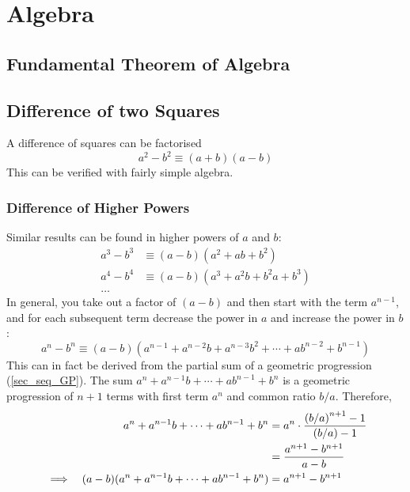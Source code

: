 \section{Algebra}

\subsection{Fundamental Theorem of Algebra}

\subsection{Difference of two Squares}

A difference of squares can be factorised
\begin{equation}
a^2 - b^2 \equiv (a + b)(a - b)
\end{equation}
This can be verified with fairly simple
algebra.

\subsubsection{Difference of Higher Powers}

Similar results can be found in higher powers of \(a\) and \(b\):
\begin{align*}
a^3 - b^3 &\equiv (a - b)(a^2 + ab + b^2) \\
a^4 - b^4 &\equiv (a - b)(a^3 + a^2b + b^2a + b^3) \\
\dots
\end{align*}
In general, you take out a factor of \((a - b)\) and then start with the
term \(a^{n - 1}\), and for each subsequent term decrease the power in \(a\)
and increase the power in \(b\):
\begin{equation}
a^n - b^n \equiv (a - b)(a^{n - 1} + a^{n - 2}b + a^{n - 3}b^2 + \dotsb +
                         ab^{n - 2} + b^{n - 1})
\end{equation}
This can in fact be derived from the partial sum of a geometric progression
(\ref{sec_seq_GP}). The sum \(a^n + a^{n - 1}b + \dotsb + ab^{n - 1} + b^n\) is
a geometric progression of \(n + 1\) terms with first term \(a^n\) and
common ratio \(b/a\).  Therefore,
\begin{alignat*}{2}
&&a^n + a^{n - 1}b + \dotsb + ab^{n - 1} + b^n &=
        a^n \cdot \frac{\pqty{b / a}^{n + 1} - 1}{(b / a) - 1} \\
&&    &= \frac{a^{n + 1} - b^{n + 1}}{a - b} \\
&\implies& (a - b)(a^n + a^{n - 1}b + \dotsb + ab^{n - 1} + b^n) &=
        a^{n + 1} - b^{n + 1}
\end{alignat*}

